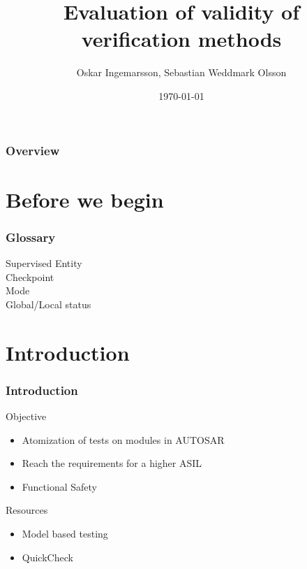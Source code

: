 \documentclass{beamer}
\title{Evaluation of validity of verification methods}
\author{Oskar Ingemarsson, Sebastian Weddmark Olsson}
\institute{Chalmers University of Technology, Mecel AB}
\date{\today}
\begin{document}
\begin{frame}
  \titlepage
\end{frame}

\begin{frame}
  \frametitle{Overview}
  \tableofcontents
\end{frame}

\section{Before we begin}

\begin{frame}
  \frametitle{Glossary}
  \begin{description}
    \item[Supervised Entity]
    \item[Checkpoint]
    \item[Mode]
    \item[Global/Local status]
  \end{description}
\end{frame}


\section{Introduction}

\begin{frame}[fragile]
  \frametitle{Introduction}
  \begin{block}{Objective}
    \begin{itemize}
        \item Atomization of tests on modules in AUTOSAR
        \item Reach the requirements for a higher ASIL
        \item Functional Safety
    \end{itemize}
   \end{block}
  \begin{block}{Resources}
    \begin{itemize}
        \item Model based testing
        \item QuickCheck
    \end{itemize}
  \end{block}
\end{frame}
\end{document}
